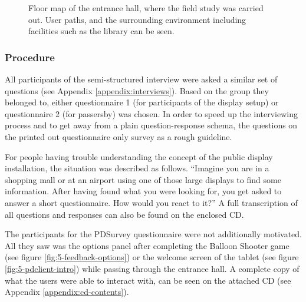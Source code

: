 		\begin{figure}[hb]
		    \begin{center}
		    \end{center}
			 \caption[Floor Map of Entrance Hall]{Floor map of the entrance hall, where the field study was carried out. User paths, and the surrounding environment including facilities such as the library can be seen.}
			 \label{fig:5-entrance-hall}
		\end{figure}




	\subsubsection{Procedure}

		All participants of the semi-structured interview were asked a similar set of questions (see Appendix \ref{appendix:interviews}). Based on the group they belonged to, either questionnaire 1 (for participants of the display setup) or questionnaire 2 (for passersby) was chosen. In order to speed up the interviewing process and to get away from a plain question-response schema, the questions on the printed out questionnaire only survey as a rough guideline. 

		For people having trouble understanding the concept of the public display installation, the situation was described as follows. ``Imagine you are in a shopping mall or at an airport using one of those large displays to find some information. After having found what you were looking for, you get asked to answer a short questionnaire. How would you react to it?'' A full transcription of all questions and responses can also be found on the enclosed CD. 

		The participants for the PDSurvey questionnaire were not additionally motivated. All they saw was the options panel after completing the Balloon Shooter game (see figure \ref{fig:5-feedback-options}) or the welcome screen of the tablet (see figure \ref{fig:5-pdclient-intro}) while passing through the entrance hall. A complete copy of what the users were able to interact with, can be seen on the attached CD (see Appendix \ref{appendix:cd-contents}).


